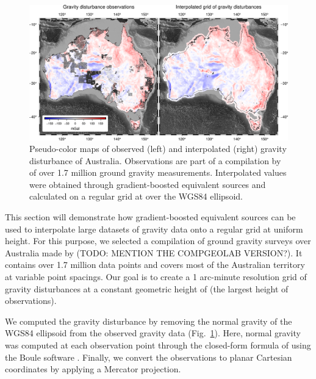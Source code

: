 \documentclass[twocolumn]{article}
\begin{document}
\begin{figure}
    \includegraphics[width=\linewidth]{figs/australia.png}
    \caption{
      Pseudo-color maps of observed (left) and
      interpolated (right) gravity disturbance of Australia.
      Observations are part of a compilation by \citet{wynne2018} of
      over 1.7 million ground gravity measurements.
      Interpolated values were obtained through gradient-boosted equivalent
      sources and calculated on a regular grid at \AustraliaEqlGridHeight{}
      over the WGS84 ellipsoid.
    }
    \label{fig:australia}
\end{figure}

This section will demonstrate how gradient-boosted equivalent sources can be
used to interpolate large datasets of gravity data onto a regular grid at
uniform height.
For this purpose, we selected a compilation of ground gravity surveys over
Australia made by \citet{wynne2018} (TODO: MENTION THE COMPGEOLAB VERSION?).
It contains over 1.7 million data points and covers most of the Australian
territory at variable point spacings.
Our goal is to create a 1 arc-minute resolution grid of gravity disturbances at
a constant geometric height of \AustraliaEqlGridHeight{} (the largest height of
observations).

We computed the gravity disturbance by removing the normal gravity of
the WGS84 ellipsoid from the observed gravity data (Fig.~\ref{fig:australia}).
Here, normal gravity was computed at each observation point through the
closed-form formula of \citet{ligotze2001} using the Boule software
\citep{boule2020}.
Finally, we convert the observations to planar Cartesian coordinates by
applying a Mercator projection.
\end{document}
